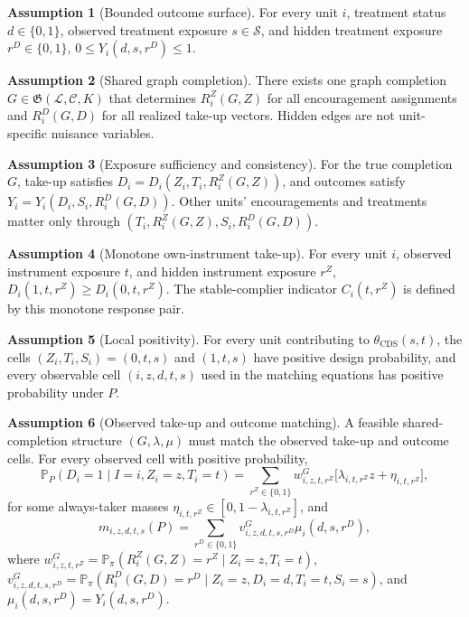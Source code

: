 \documentclass[11pt]{article}
\renewcommand{\Pr}{\mathbb{P}}
\theoremstyle{definition}
\newtheorem{assumption}{Assumption}
\theoremstyle{plain}
\theoremstyle{remark}
\begin{document}
\begin{assumption}[Bounded outcome surface]\label{ass:bounded}
For every unit \(i\), treatment status \(d\in\{0,1\}\), observed treatment exposure \(s\in\mathcal S\), and hidden treatment exposure \(r^D\in\{0,1\}\), \(0\le Y_i(d,s,r^D)\le1\).
\end{assumption}

\begin{assumption}[Shared graph completion]\label{ass:shared}
There exists one graph completion \(G\in\mathfrak G(\mathcal L,\mathcal C,K)\) that determines \(R_i^Z(G,Z)\) for all encouragement assignments and \(R_i^D(G,D)\) for all realized take-up vectors. Hidden edges are not unit-specific nuisance variables.
\end{assumption}

\begin{assumption}[Exposure sufficiency and consistency]\label{ass:consistency}
For the true completion \(G\), take-up satisfies \(D_i=D_i(Z_i,T_i,R_i^Z(G,Z))\), and outcomes satisfy \(Y_i=Y_i(D_i,S_i,R_i^D(G,D))\). Other units' encouragements and treatments matter only through \((T_i,R_i^Z(G,Z),S_i,R_i^D(G,D))\).
\end{assumption}

\begin{assumption}[Monotone own-instrument take-up]\label{ass:monotone}
For every unit \(i\), observed instrument exposure \(t\), and hidden instrument exposure \(r^Z\), \(D_i(1,t,r^Z)\ge D_i(0,t,r^Z)\). The stable-complier indicator \(C_i(t,r^Z)\) is defined by this monotone response pair.
\end{assumption}

\begin{assumption}[Local positivity]\label{ass:positivity}
For every unit contributing to \(\theta_{\mathrm{CDS}}(s,t)\), the cells \((Z_i,T_i,S_i)=(0,t,s)\) and \((1,t,s)\) have positive design probability, and every observable cell \((i,z,d,t,s)\) used in the matching equations has positive probability under \(P\).
\end{assumption}

\begin{assumption}[Observed take-up and outcome matching]\label{ass:matching}
A feasible shared-completion structure \((G,\lambda,\mu)\) must match the observed take-up and outcome cells. For every observed cell with positive probability,
\[
\Pr_P(D_i=1\mid I=i,Z_i=z,T_i=t)
=
\sum_{r^Z\in\{0,1\}} w_{i,z,t,r^Z}^G \bigl[\lambda_{i,t,r^Z} z + \eta_{i,t,r^Z}\bigr],
\]
for some always-taker masses \(\eta_{i,t,r^Z}\in[0,1-\lambda_{i,t,r^Z}]\), and
\[
m_{i,z,d,t,s}(P)
=
\sum_{r^D\in\{0,1\}} v_{i,z,d,t,s,r^D}^G \mu_i(d,s,r^D),
\]
where \(w_{i,z,t,r^Z}^G=\Pr_\pi(R_i^Z(G,Z)=r^Z\mid Z_i=z,T_i=t)\), \(v_{i,z,d,t,s,r^D}^G=\Pr_\pi(R_i^D(G,D)=r^D\mid Z_i=z,D_i=d,T_i=t,S_i=s)\), and \(\mu_i(d,s,r^D)=Y_i(d,s,r^D)\).
\end{assumption}
\end{document}
